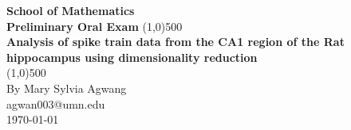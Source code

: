 


\begin{titlepage}
\begin{center}
\vspace*{1cm}  %
\Large{\textbf{School of Mathematics}}\\ %
\Large{\textbf{Preliminary Oral Exam}} %
\vfill %
\line(1,0){500}\\[1mm]
\huge{\textbf{ Analysis of spike train data from the CA1 region of the Rat  hippocampus
using dimensionality reduction}}\\[3mm]
\line(1,0){500}\\
\vfill %
By Mary Sylvia Agwang\\
agwan003@umn.edu\\
\today %

\end{center}
\end{titlepage}



\newpage












